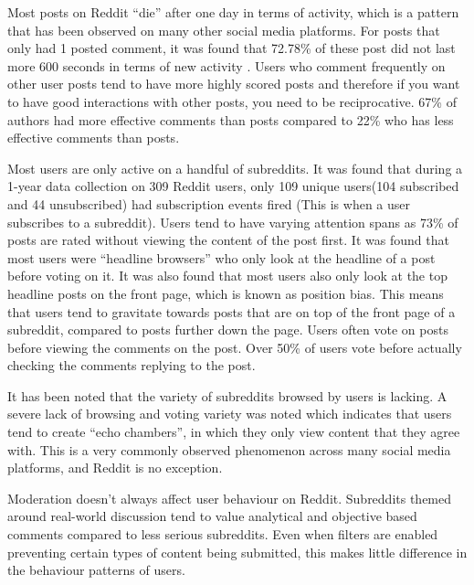 Most posts on Reddit “die” after one day in terms of activity, which is a pattern that has been observed on many other social media platforms. For posts that only had 1 posted comment, it was found that 72.78\% of these post did not last more  600 seconds in terms of new activity \cite{7}. Users who comment frequently on other user posts tend to have more highly scored posts and therefore if you want to have good interactions with other posts, you need to be reciprocative. 67\% of authors had more effective comments than posts compared to 22\% who has less effective comments than posts.

Most users are only active on a handful of subreddits. It was found that during a 1-year data collection on 309 Reddit users, only 109 unique users(104 subscribed and 44 unsubscribed) had subscription events fired (This is when a user subscribes to a subreddit). Users tend to have varying attention spans as 73\% of posts are rated without viewing the content of the post first. It was found that most users were “headline browsers” who only look at the headline of a post before voting on it. It was also found that most users also only look at the top headline posts on the front page, which is known as position bias. This means that users tend to gravitate towards posts that are on top of the front page of a subreddit, compared to posts further down the page. Users often vote on posts before viewing the comments on the post. Over 50\% of users vote before actually checking the comments replying to the post. \cite{8}

It has been noted that the variety of subreddits browsed by users is lacking. A severe lack of browsing and voting variety was noted which indicates that users tend to create “echo chambers”, in which they only view content that they agree with. \cite{8} This is a very commonly observed phenomenon across many social media platforms, and Reddit is no exception. \cite{8}

Moderation doesn’t always affect user behaviour on Reddit. Subreddits themed around real-world discussion tend to value analytical and objective based comments compared to less serious subreddits. Even when filters are enabled preventing certain types of content being submitted, this makes little difference in the behaviour patterns of users.


